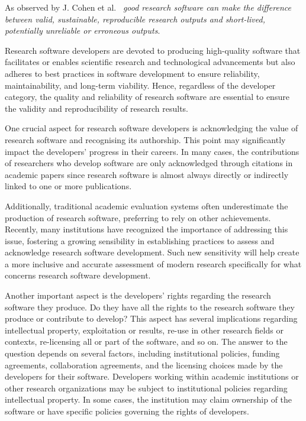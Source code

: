 As observed by J. Cohen et al.~\cite{TheFourPillarsOfRSE_2021} \textit{good research software can make the difference between valid, sustainable, reproducible research outputs and short-lived, potentially unreliable or erroneous outputs}.

Research software developers are devoted to producing high-quality software that facilitates or enables scientific research and technological advancements but also adheres to best practices in software development to ensure reliability, maintainability, and long-term viability. Hence, regardless of the developer category, the quality and reliability of research software are essential to ensure the validity and reproducibility of research results.

One crucial aspect for research software developers is acknowledging the value of research software and recognising its authorship. This point may significantly impact the developers' progress in their careers. In many cases, the contributions of researchers who develop software are only acknowledged through citations in academic papers since research software is almost always directly or indirectly linked to one or more publications.

Additionally, traditional academic evaluation systems often underestimate the production of research software, preferring to rely on other achievements. Recently, many institutions have recognized the importance of addressing this issue, fostering a growing sensibility in establishing practices to assess and acknowledge research software development. Such new sensitivity will help create a more inclusive and accurate assessment of modern research specifically for what concerns research software development.

Another important aspect is the developers' rights regarding the research software they produce. Do they have all the rights to the research software they produce or contribute to develop? This aspect has several implications regarding intellectual property, exploitation or results, re-use in other research fields or contexts, re-licensing all or part of the software, and so on. The answer to the question depends on several factors, including institutional policies, funding agreements, collaboration agreements, and the licensing choices made by the developers for their software. Developers working within academic institutions or other research organizations may be subject to institutional policies regarding intellectual property. In some cases, the institution may claim ownership of the software or have specific policies governing the rights of developers.

